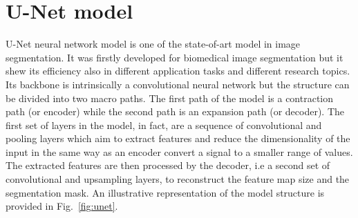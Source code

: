 \documentclass{standalone}
\begin{document}
\section[U-Net model]{U-Net model}\label{segmentation:Unet}

U-Net neural network model is one of the state-of-art model in image segmentation.
It was firstly developed for biomedical image segmentation but it shew its efficiency also in different application tasks and different research topics.
Its backbone is intrinsically a  convolutional neural network but the structure can be divided into two macro paths.
The first path of the model is a contraction path (or encoder) while the second path is an expansion path (or decoder).
The first set of layers in the model, in fact, are a sequence of convolutional and pooling layers which aim to extract features and reduce the dimensionality of the input in the same way as an encoder convert a signal to a smaller range of values.
The extracted features are then processed by the decoder, i.e a second set of convolutional and upsampling layers, to reconstruct the feature map size and the segmentation mask.
An illustrative representation of the model structure is provided in Fig.~\ref{fig:unet}.




\end{document}
